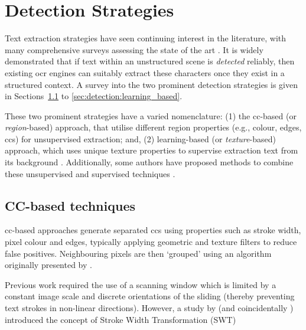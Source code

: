 \section{Detection Strategies}
\label{sec:detection_strategies}

Text extraction strategies have seen continuing interest in the literature, with many comprehensive surveys assessing the state of the art \cite{Chen:2000ua, Jung:2004uwa, Zhang:2008vfa, Liang:2005uy, Jung:2004uw}. It is widely demonstrated that if text within an unstructured scene is \textit{detected} reliably, then existing \gls{ocr} engines can suitably extract these characters \citep{Smith:2007dc} once they exist in a structured context. A survey into the two prominent detection strategies is given in Sections~\ref{sec:detection:cc_based} to \ref{sec:detection:learning_based}.

These two prominent strategies have a varied nomenclature: (1) the \gls{cc}-based (or \textit{region}-based) approach, that utilise different region properties (e.g., colour, edges, \glspl{cc}) \citep{Jain:1998wd, Kim:1996tw, Liu:2006wh, Chen:2011ul, Li:2012wd, Zhang:2011cl, Shivakumara:2011dn, Epshtein:2010tj, Zhang:2010wa, Shivakumara:2010wu, Liu:2008tz, Subramanian:2007tf, Lee:2010vv, Sun:2010tg} for unsupervised extraction; and, (2) learning-based (or \textit{texture}-based) approach, which uses unique texture properties to supervise extraction text from its background \citep{Wang:2009vp, Hanif:2009tm, Tu:2003tg, Ye:2005wu, Lee:2003cn, XiangrongChen:2004ha, Chen:2005wv}. Additionally, some authors have proposed methods to combine these unsupervised and supervised techniques \citep{Mutch:2006ub, Mairal:2008uw, Bengio:2006vb}.

\subsection{CC-based techniques}
\label{sec:detection:cc_based}

\gls{cc}-based approaches generate separated \glspl{cc} using properties such as stroke width, pixel colour and edges, typically applying geometric and texture filters to reduce false positives. Neighbouring pixels are then `grouped' using an algorithm originally presented by \citet{Horn:1986vc}. 

Previous work required the use of a scanning window \citep{XiangrongChen:2004ha, Lienhart:2002ub, Jung:2009do} which is limited by a constant image scale and discrete orientations of the sliding (thereby preventing text strokes in non-linear directions). However, a study by \citet{Epshtein:2010tj} (and coincidentally \citet{Zhang:2011cl}) introduced the concept of Stroke Width Transformation (SWT)

